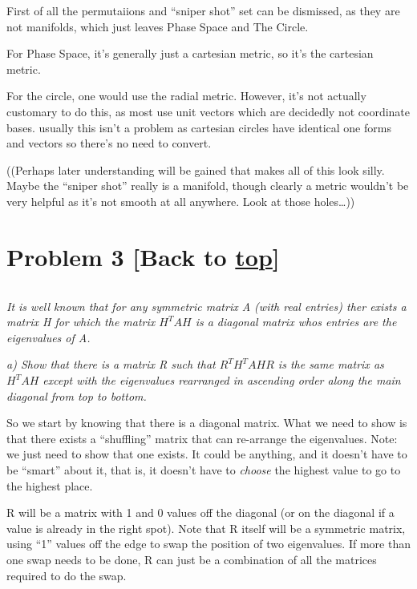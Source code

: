 \documentclass[landscape,letterpaper,10pt,english]{article}
\begin{document}
First of all the permutaiions and ``sniper shot'' set can be dismissed,
as they are not manifolds, which just leaves Phase Space and The Circle.

    For Phase Space, it's generally just a cartesian metric, so it's the
cartesian metric.

For the circle, one would use the radial metric. However, it's not
actually customary to do this, as most use unit vectors which are
decidedly not coordinate bases. usually this isn't a problem as
cartesian circles have identical one forms and vectors so there's no
need to convert.

((Perhaps later understanding will be gained that makes all of this look
silly. Maybe the ``sniper shot'' really is a manifold, though clearly a
metric wouldn't be very helpful as it's not smooth at all anywhere. Look
at those holes\ldots))

    \hypertarget{problem-3-back-to-top}{%
\section{\texorpdfstring{Problem 3 {[}Back to
\hyperref[toc]{top}{]}}{Problem 3 {[}Back to {]}}}\label{problem-3-back-to-top}}

\[\label{P3}\]

\emph{It is well known that for any symmetric matrix A (with real
entries) ther exists a matrix H for which the matrix \(H^TAH\) is a
diagonal matrix whos entries are the eigenvalues of A.}

\emph{a) Show that there is a matrix R such that \(R^TH^TAHR\) is the
same matrix as \(H^TAH\) except with the eigenvalues rearranged in
ascending order along the main diagonal from top to bottom.}

    So we start by knowing that there is a diagonal matrix. What we need to
show is that there exists a ``shuffling'' matrix that can re-arrange the
eigenvalues. Note: we just need to show that one exists. It could be
anything, and it doesn't have to be ``smart'' about it, that is, it
doesn't have to \emph{choose} the highest value to go to the highest
place.

R will be a matrix with 1 and 0 values off the diagonal (or on the
diagonal if a value is already in the right spot). Note that R itself
will be a symmetric matrix, using ``1'' values off the edge to swap the
position of two eigenvalues. If more than one swap needs to be done, R
can just be a combination of all the matrices required to do the swap.
\end{document}

